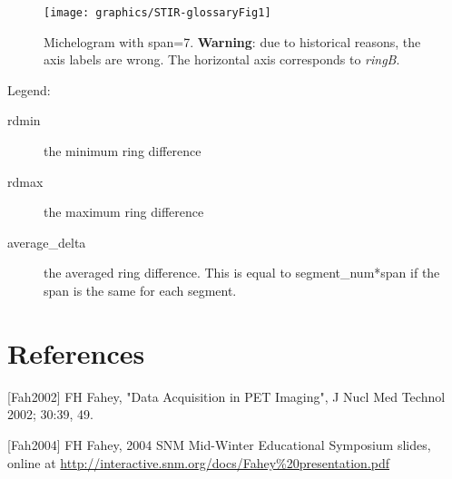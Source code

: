 \documentclass{article}
\begin{document}
\begin{figure}[htbp]
\begin{center}
\texttt{[image: graphics/STIR-glossaryFig1]}
\caption{Michelogram with span=7. \textbf{Warning}: due to historical 
reasons, the axis labels are wrong. The horizontal axis corresponds to
\textit{ringB}.}
\end{center}
\end{figure}


Legend: 
\begin{description}
\item[rdmin] the minimum ring difference
\item[rdmax] the maximum ring difference
\item[average\_delta] the averaged ring difference. This is equal 
to segment\_num*span if the span is the same for each segment.
\end{description}

\section*{References}

[Fah2002] FH Fahey, "Data Acquisition in PET Imaging", J Nucl Med Technol 2002; 30:39, 49.

[Fah2004] FH Fahey, 2004 SNM Mid-Winter Educational Symposium slides, online at
\url{http://interactive.snm.org/docs/Fahey%20presentation.pdf}
\end{document}
